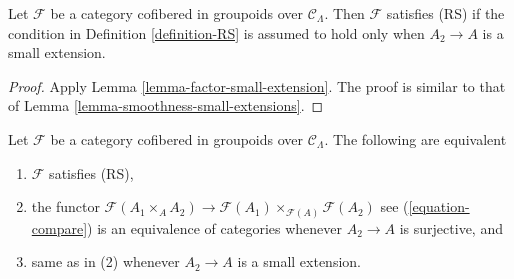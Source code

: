 \begin{lemma}
\label{lemma-RS-small-extension}
Let $\mathcal{F}$ be a category cofibered in groupoids over $\mathcal 
C_\Lambda$. Then $\mathcal{F}$ satisfies (RS) if the condition in 
Definition \ref{definition-RS} is assumed to hold only when $A_2 \to A$ 
is a small extension. 
\end{lemma}

\begin{proof}
Apply Lemma \ref{lemma-factor-small-extension}.  The proof is similar to that 
of Lemma \ref{lemma-smoothness-small-extensions}.
\end{proof}

\begin{lemma}
\label{lemma-RS-2-categorical}
Let $\mathcal{F}$ be a category cofibered in groupoids over
$\mathcal{C}_\Lambda$. The following are equivalent
\begin{enumerate}
\item $\mathcal{F}$ satisfies (RS),
\item the functor
$\mathcal{F}(A_1 \times_A A_2) \to
\mathcal{F}(A_1) \times_{\mathcal{F}(A)} \mathcal{F}(A_2)$
see (\ref{equation-compare}) is an equivalence of 
categories whenever $A_2 \to A$ is surjective, and
\item same as in (2) whenever $A_2 \to A$ is a small extension.
\end{enumerate}
\end{lemma}

